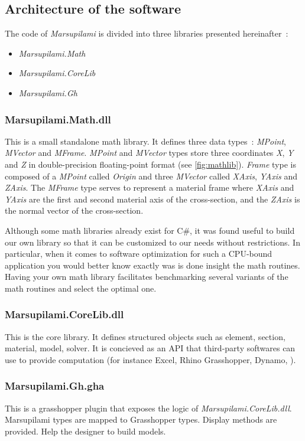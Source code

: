 \subsection{Architecture of the software}
The code of \emph{Marsupilami} is divided into three libraries presented hereinafter~:
\begin{itemize}
\item \textit{Marsupilami.Math}
\item \textit{Marsupilami.CoreLib}
\item \textit{Marsupilami.Gh}
\end{itemize}

\subsubsection{Marsupilami.Math.dll}
This is a small standalone math library. It defines three data types~: \textit{MPoint}, \textit{MVector} and \textit{MFrame}. \textit{MPoint} and \textit{MVector} types store three coordinates \textit{X}, \textit{Y} and \textit{Z} in double-precision floating-point format (see \cref{fig:mathlib}). \textit{Frame} type is composed of a \textit{MPoint} called \textit{Origin} and three \textit{MVector} called \textit{XAxis}, \textit{YAxis} and \textit{ZAxis}. The \textit{MFrame} type serves to represent a material frame where \textit{XAxis} and \textit{YAxis} are the first and second material axis of the cross-section, and the \textit{ZAxis} is the normal vector of the cross-section.

Although some math libraries already exist for C\#, it was found useful to build our own library so that it can be customized to our needs without restrictions. In particular, when it comes to software optimization for such a CPU-bound application you would better know exactly was is done insight the math routines. Having your own math library facilitates benchmarking several variants of the math routines and select the optimal one.

\subsubsection{Marsupilami.CoreLib.dll}
This is the core library. It defines structured objects such as element, section, material, model, solver. It is concieved as an API that third-party softwares can use to provide computation (for instance Excel, Rhino Grasshopper, Dynamo, \telp{}).

\subsubsection{Marsupilami.Gh.gha}
This is a grasshopper plugin that exposes the logic of \textit{Marsupilami.CoreLib.dll}. Marsupilami types are mapped to Grasshopper types. Display methods are provided. Help the designer to build models.

